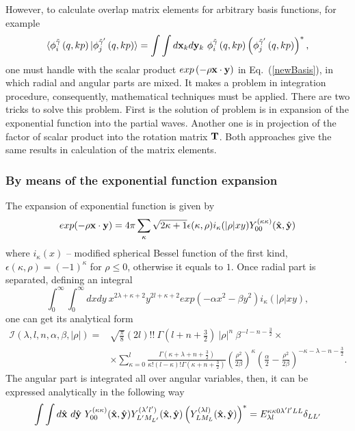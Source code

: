 \documentclass[
12pt, %
oneside, %
english, %
onehalfspacing, %
headsepline, %
]{MastersDoctoralThesis} %
\begin{document}
However, to calculate overlap matrix elements for arbitrary basis functions, for example
\begin{equation}
\langle \phi_{i}^{\tilde{\gamma}}\left(q,kp \right) \vert 
\phi_{j}^{\tilde{\gamma}^{\prime}}\left(q,kp \right) \rangle =
\int \int d{\bf x}_k d{\bf y}_k ~\phi_{i}^{\tilde{\gamma}}\left(q,kp \right) \left( \phi_{j}^{\tilde{\gamma}^{\prime}}\left(q,kp \right) \right)^{*},
\label{me_arb}
\end{equation}
one must handle with the scalar product $exp\left(- \rho {\bf x} \cdot {\bf y} \right)$ in  Eq.~(\ref{newBasis}), in which radial and angular parts are mixed. It makes a problem in integration procedure, consequently, mathematical techniques must be applied. There are two tricks to solve this problem.  First is the solution of problem is in expansion of  the exponential function into the partial waves. Another one is in projection of the factor of scalar product into the rotation matrix ${\bf T}$. Both approaches give the same results in calculation of the matrix elements. 
\subsubsection{By means of the  exponential function expansion}
\label{overlap_by_exp}
The expansion of exponential function is given by 
\begin{equation}
exp(-\rho {\bf x} \cdot {\bf y}) = 4 \pi \sum_{\kappa} \sqrt{2\kappa+1} 
\epsilon(\kappa, \rho)i_{\kappa}(|\rho|xy)Y_{00}^{(\kappa\kappa)}(\hat{{\bf x}},\hat{{\bf y}})
\end{equation} 
where $i_{\kappa}(x) $ -- modified spherical Bessel function of the first kind, $\epsilon(\kappa, \rho)=(-1)^{\kappa}$ for $\rho \le 0$, otherwise it equals to $1$.
Once radial part is separated, defining an integral
\begin{equation}
\int_0^\infty \int_0^\infty  dx dy~ x^{2\lambda+\kappa+2}y^{2 l +\kappa+2} exp\left( -\alpha x^2 - \beta y^2 \right) i_{\kappa}(|\rho|xy),
\end{equation}
one can get its analytical form
\begin{align}
\mathcal{I}(\lambda, l, n, \alpha, \beta, |\rho|) =& \sqrt{\frac{\pi}{8}}(2l)!!~ \Gamma(l+n+\tfrac{3}{2})~|\rho|^{n} ~\beta^{-l-n-\tfrac{3}{2}} \times \nonumber \\
& \times \sum_{\kappa=0}^{l} \frac{\Gamma(\kappa+\lambda+n+\tfrac{3}{2})}{\kappa! (l-\kappa)! \Gamma(\kappa+n+\tfrac{3}{2})}
\left(\frac{\rho^2}{2\beta}\right)^{\kappa} \left( \frac{\alpha}{2} - \frac{\rho^2}{2\beta}  \right)^{-\kappa-\lambda-n-\tfrac{3}{2}}.
\label{overlap1}
\end{align}
The angular part is integrated all over angular variables, then,  it can be expressed analytically in the following way
\begin{align}
\int \int d\hat{\bf x}~d\hat{\bf y}~ Y_{00}^{(\kappa\kappa)}(\hat{{\bf x}},\hat{{\bf y}})  Y_{L^{\prime}M_{L^{\prime}}}^{(\lambda^{\prime} l^{\prime})}(\hat{{\bf x}},\hat{{\bf y}}) \left(  Y_{LM_L}^{(\lambda l)}(\hat{{\bf x}},\hat{{\bf y}}) \right)^{*} =  {E}^{\kappa \kappa 0 \lambda^{\prime} l^{\prime} L L}_{\lambda l} \delta_{LL^{\prime}} 
\label{angular_part_overlap1}
\end{align}
\end{document}

